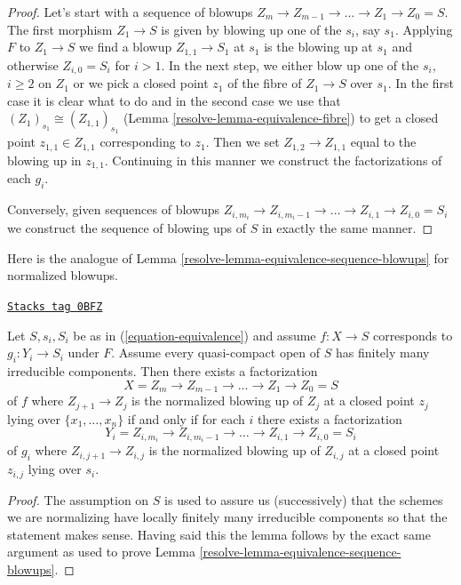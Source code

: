 \begin{proof}

Let's start with a sequence of blowups
$Z_m \to Z_{m - 1} \to \ldots \to Z_1 \to Z_0 = S$.
The first morphism $Z_1 \to S$ is given
by blowing up one of the $s_i$, say $s_1$. Applying $F$
to $Z_1 \to S$ we find a blowup $Z_{1, 1} \to S_1$ at $s_1$
is the blowing up at $s_1$ and otherwise $Z_{i, 0} = S_i$ for $i > 1$.
In the next step, we either blow up one of the $s_i$, $i \geq 2$
on $Z_1$ or we pick a closed point $z_1$ of the fibre of $Z_1 \to S$
over $s_1$. In the first case it is clear what to do and in
the second case we use that $(Z_1)_{s_1} \cong (Z_{1, 1})_{s_1}$
(Lemma \ref{resolve-lemma-equivalence-fibre})
to get a closed point $z_{1, 1} \in Z_{1, 1}$ corresponding to $z_1$.
Then we set $Z_{1, 2} \to Z_{1, 1}$ equal to the blowing up
in $z_{1, 1}$. Continuing in this manner we construct the factorizations
of each $g_i$.

\medskip\noindent
Conversely, given sequences of blowups
$Z_{i, m_i} \to Z_{i, m_i - 1} \to \ldots \to Z_{i, 1} \to Z_{i, 0} = S_i$
we construct the sequence of blowing ups of $S$ in exactly the same manner.
\end{proof}

Here is the analogue of
Lemma \ref{resolve-lemma-equivalence-sequence-blowups}
for normalized blowups.

\begin{lemma}
\label{resolve-lemma-equivalence-sequence-normalized-blowups}
\href{https://stacks.math.columbia.edu/tag/0BFZ}{\texttt{Stacks tag 0BFZ}}

Let $S, s_i, S_i$ be as in (\ref{equation-equivalence})
and assume $f : X \to S$ corresponds to $g_i : Y_i \to S_i$ under $F$.
Assume every quasi-compact open of $S$ has finitely many irreducible
components.  Then there exists a factorization
$$
X = Z_m \to Z_{m - 1} \to \ldots \to Z_1 \to Z_0 = S
$$
of $f$ where $Z_{j + 1} \to Z_j$ is the normalized blowing up of $Z_j$
at a closed point $z_j$ lying over $\{x_1, \ldots, x_n\}$ if and only if
for each $i$ there exists a factorization
$$
Y_i = Z_{i, m_i} \to Z_{i, m_i - 1} \to \ldots \to Z_{i, 1} \to Z_{i, 0} = S_i
$$
of $g_i$ where $Z_{i, j + 1} \to Z_{i, j}$ is the normalized blowing up of
$Z_{i, j}$ at a closed point $z_{i, j}$ lying over $s_i$.
\end{lemma}

\begin{proof}

The assumption on $S$ is used to assure us (successively) that
the schemes we are normalizing have locally finitely many irreducible
components so that the statement makes sense. Having said this the
lemma follows by the exact same argument as used to prove
Lemma \ref{resolve-lemma-equivalence-sequence-blowups}.
\end{proof}

